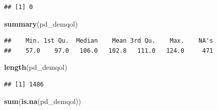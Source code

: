 \documentclass[
]{article}
\newenvironment{Shaded}{\begin{snugshade}}{\end{snugshade}}
\newcommand{\CommentTok}[1]{\textcolor[rgb]{0.56,0.35,0.01}{\textit{#1}}}
\newcommand{\FunctionTok}[1]{\textcolor[rgb]{0.13,0.29,0.53}{\textbf{#1}}}
\newcommand{\NormalTok}[1]{#1}
\newcommand{\OtherTok}[1]{\textcolor[rgb]{0.56,0.35,0.01}{#1}}
\newcommand{\SpecialCharTok}[1]{\textcolor[rgb]{0.81,0.36,0.00}{\textbf{#1}}}
\newcommand{\StringTok}[1]{\textcolor[rgb]{0.31,0.60,0.02}{#1}}
\begin{document}
\begin{verbatim}
## [1] 0
\end{verbatim}

\begin{Shaded}
\end{Shaded}

\begin{Shaded}
\begin{Highlighting}[]
\FunctionTok{summary}\NormalTok{(pd\_demqol)}
\end{Highlighting}
\end{Shaded}

\begin{verbatim}
##    Min. 1st Qu.  Median    Mean 3rd Qu.    Max.    NA's 
##    57.0    97.0   106.0   102.8   111.0   124.0     471
\end{verbatim}

\begin{Shaded}
\begin{Highlighting}[]
\FunctionTok{length}\NormalTok{(pd\_demqol)}
\end{Highlighting}
\end{Shaded}

\begin{verbatim}
## [1] 1486
\end{verbatim}

\begin{Shaded}
\begin{Highlighting}[]
\FunctionTok{sum}\NormalTok{(}\FunctionTok{is.na}\NormalTok{(pd\_demqol))}
\end{Highlighting}
\end{Shaded}
\end{document}
